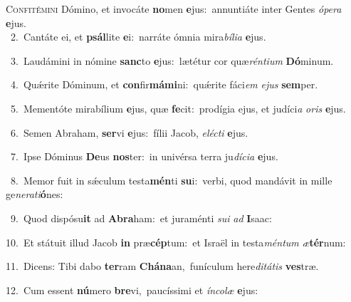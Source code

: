 \lettrine{\initial\textcolor{\initialcolor}{C}}{onfitémini} Dómino, et invocáte \textbf{no}\-men \textbf{e}\-jus:~\star annuntiáte inter Gentes \textit{ó}\-\textit{pe}\textit{ra} \textbf{e}\-jus.\\
{\numbfont\textcolor{\numbcolor}{~2.}}~Cantáte ei, et \textbf{psál}\-lite \textbf{e}\-i:~\star narráte ómnia mira\-\textit{bí}\-\textit{li}\textit{a} \textbf{e}\-jus.\par
{\numbfont\textcolor{\numbcolor}{~3.}}~Laudámini in nómine \textbf{sanc}\-to \textbf{e}\-jus:~\star lætétur cor quæ\-\textit{rén}\-\textit{ti}\textit{um} \textbf{Dó}\-minum.\par
{\numbfont\textcolor{\numbcolor}{~4.}}~Quǽrite Dóminum, et \textbf{con}\-fir\-\textbf{má}\-\textbf{mi}ni:~\star quǽrite fáci\textit{em} \textit{e}\-\textit{jus} \textbf{sem}\-per.\par
{\numbfont\textcolor{\numbcolor}{~5.}}~Mementóte mirabílium \textbf{e}\-jus, quæ \textbf{fe}\-cit:~\star prodígia ejus, et judíci\textit{a} \textit{o}\-\textit{ris} \textbf{e}\-jus.\par
{\numbfont\textcolor{\numbcolor}{~6.}}~Semen Abraham, \textbf{ser}\-vi \textbf{e}\-jus:~\star fílii Jacob, \textit{e}\-\textit{léc}\textit{ti} \textbf{e}\-jus.\par
{\numbfont\textcolor{\numbcolor}{~7.}}~Ipse Dóminus \textbf{De}\-us \textbf{nos}\-ter:~\star in univérsa terra ju\-\textit{dí}\-\textit{ci}\textit{a} \textbf{e}\-jus.\par
{\numbfont\textcolor{\numbcolor}{~8.}}~Memor fuit in sǽculum testa\-\textbf{mén}\-ti \textbf{su}\-i:~\star verbi, quod mandávit in mille ge\-\textit{ne}\-\textit{ra}\textit{ti}\textbf{ó}nes:\par
{\numbfont\textcolor{\numbcolor}{~9.}}~Quod dispósu\textbf{it} ad \textbf{A}\-\textbf{bra}ham:~\star et juraménti \textit{su}\-\textit{i} \textit{ad} \textbf{I}\-saac:\par
{\numbfont\textcolor{\numbcolor}{10.}}~Et státuit illud Jacob \textbf{in} præ\-\textbf{cép}\-tum:~\star et Israël in testa\-\textit{mén}\-\textit{tum} \textit{æ}\-\textbf{tér}num:\par
{\numbfont\textcolor{\numbcolor}{11.}}~Dicens: Tibi dabo \textbf{ter}\-ram \textbf{Chá}\-\textbf{na}an,~\star funículum here\-\textit{di}\-\textit{tá}\textit{tis} \textbf{ves}\-træ.\par
{\numbfont\textcolor{\numbcolor}{12.}}~Cum essent \textbf{nú}\-mero \textbf{bre}\-vi,~\star paucíssimi et \textit{ín}\-\textit{co}\textit{læ} \textbf{e}\-jus:\par
